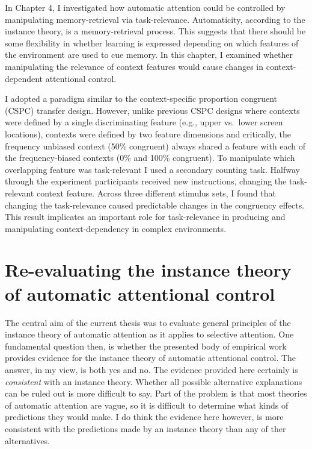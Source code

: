 \documentclass[]{DissertateCUNY}
\begin{document}
In Chapter 4, I investigated how automatic attention could be controlled
by manipulating memory-retrieval via task-relevance. Automaticity,
according to the instance theory, is a memory-retrieval process. This
suggests that there should be some flexibility in whether learning is
expressed depending on which features of the environment are used to cue
memory. In this chapter, I examined whether manipulating the relevance
of context features would cause changes in context-dependent attentional
control.

I adopted a paradigm similar to the context-specific proportion
congruent (CSPC) transfer design. However, unlike previous CSPC designs
where contexts were defined by a single discriminating feature (e.g.,
upper vs.~lower screen locations), contexts were defined by two feature
dimensions and critically, the frequency unbiased context (50\%
congruent) always shared a feature with each of the frequency-biased
contexts (0\% and 100\% congruent). To manipulate which overlapping
feature was task-relevant I used a secondary counting task. Halfway
through the experiment participants received new instructions, changing
the task-relevant context feature. Across three different stimulus sets,
I found that changing the task-relevance caused predictable changes in
the congruency effects. This result implicates an important role for
task-relevance in producing and manipulating context-dependency in
complex environments.

\hypertarget{re-evaluating-the-instance-theory-of-automatic-attentional-control}{%
\section{Re-evaluating the instance theory of automatic attentional
control}\label{re-evaluating-the-instance-theory-of-automatic-attentional-control}}

The central aim of the current thesis was to evaluate general principles
of the instance theory of automatic attention as it applies to selective
attention. One fundamental question then, is whether the presented body
of empirical work provides evidence for the instance theory of automatic
attentional control. The answer, in my view, is both yes and no. The
evidence provided here certainly is \textit{consistent} with an instance
theory. Whether all possible alternative explanations can be ruled out
is more difficult to say. Part of the problem is that most theories of
automatic attention are vague, so it is difficult to determine what
kinds of predictions they would make. I do think the evidence here
however, is more consistent with the predictions made by an instance
theory than any of ther alternatives.
\end{document}
